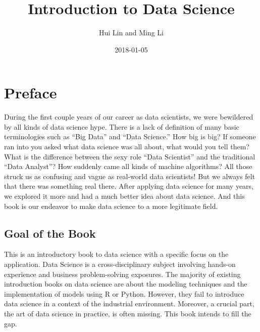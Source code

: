 \documentclass[12pt,]{krantz}
\title{Introduction to Data Science}
\author{Hui Lin and Ming Li}
\date{2018-01-05}
\theoremstyle{definition}
\theoremstyle{definition}
\theoremstyle{remark}
\begin{document}
\maketitle

\thispagestyle{empty}
\begin{center}
\end{center}

\setlength{\abovedisplayskip}{-5pt}
\setlength{\abovedisplayshortskip}{-5pt}

{
\hypersetup{linkcolor=black}
\setcounter{tocdepth}{2}
\tableofcontents
}
\listoftables
\listoffigures
\chapter*{Preface}\label{preface}


During the first couple years of our career as data scientists, we were
bewildered by all kinds of data science hype. There is a lack of
definition of many basic terminologies such as ``Big Data'' and ``Data
Science.'' How big is big? If someone ran into you asked what data
science was all about, what would you tell them? What is the difference
between the sexy role ``Data Scientist'' and the traditional ``Data
Analyst''? How suddenly came all kinds of machine algorithms? All those
struck us as confusing and vague as real-world data scientists! But we
always felt that there was something real there. After applying data
science for many years, we explored it more and had a much better idea
about data science. And this book is our endeavor to make data science
to a more legitimate field.

\section*{Goal of the Book}\label{goal-of-the-book}


This is an introductory book to data science with a specific focus on
the application. Data Science is a cross-disciplinary subject involving
hands-on experience and business problem-solving exposures. The majority
of existing introduction books on data science are about the modeling
techniques and the implementation of models using R or Python. However,
they fail to introduce data science in a context of the industrial
environment. Moreover, a crucial part, the art of data science in
practice, is often missing. This book intends to fill the gap.
\end{document}
